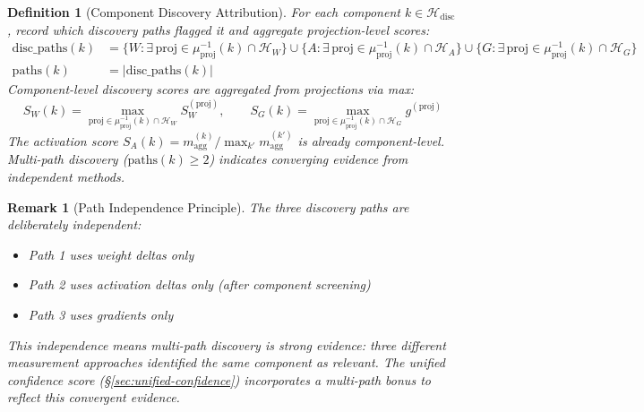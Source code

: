 \documentclass[11pt]{article}
\newtheorem{definition}{Definition}[section]
\newtheorem{remark}{Remark}[section]
\begin{document}
\begin{definition}[Component Discovery Attribution]
\label{def:component-discovery-attribution}
For each component $k \in \mathcal{H}_{\text{disc}}$, record which discovery paths flagged it and aggregate projection-level scores:
\begin{align}
\text{disc\_paths}(k) &= \{W : \exists\, \text{proj} \in \mu_{\text{proj}}^{-1}(k) \cap \mathcal{H}_W\} \cup \{A : \exists\, \text{proj} \in \mu_{\text{proj}}^{-1}(k) \cap \mathcal{H}_A\} \cup \{G : \exists\, \text{proj} \in \mu_{\text{proj}}^{-1}(k) \cap \mathcal{H}_G\} \\[0.5em]
\text{paths}(k) &= |\text{disc\_paths}(k)|
\end{align}
Component-level discovery scores are aggregated from projections via max:
\begin{equation}
S_W(k) = \max_{\text{proj} \in \mu_{\text{proj}}^{-1}(k) \cap \mathcal{H}_W} S^{(\text{proj})}_W, \qquad S_G(k) = \max_{\text{proj} \in \mu_{\text{proj}}^{-1}(k) \cap \mathcal{H}_G} g^{(\text{proj})}
\end{equation}
The activation score $S_A(k) = m^{(k)}_{\text{agg}} / \max_{k'} m^{(k')}_{\text{agg}}$ is already component-level. Multi-path discovery ($\text{paths}(k) \geq 2$) indicates converging evidence from independent methods.
\end{definition}

\begin{remark}[Path Independence Principle]
\label{rem:path-independence-principle}
The three discovery paths are deliberately independent:
\begin{itemize}[nosep]
\item Path 1 uses weight deltas only
\item Path 2 uses activation deltas only (after component screening)
\item Path 3 uses gradients only
\end{itemize}
This independence means multi-path discovery is strong evidence: three different measurement approaches identified the same component as relevant. The unified confidence score (\S\ref{sec:unified-confidence}) incorporates a multi-path bonus to reflect this convergent evidence.
\end{remark}
\end{document}

